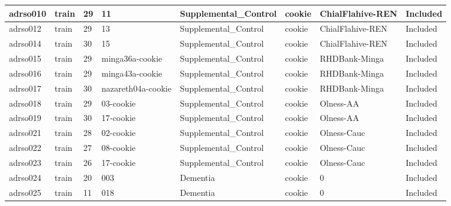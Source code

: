 \begin{center}
\begin{longtable}{|l|l|l|l|l|l|l|l|}
adrso010       & train                 & 29              & 11                 & Supplemental\_Control & cookie          & ChialFlahive-REN & Included      \\ \hline
adrso012       & train                 & 29              & 13                 & Supplemental\_Control & cookie          & ChialFlahive-REN & Included      \\ \hline
adrso014       & train                 & 30              & 15                 & Supplemental\_Control & cookie          & ChialFlahive-REN & Included      \\ \hline
adrso015       & train                 & 29              & minga36a-cookie    & Supplemental\_Control & cookie          & RHDBank-Minga    & Included      \\ \hline
adrso016       & train                 & 29              & minga43a-cookie    & Supplemental\_Control & cookie          & RHDBank-Minga    & Included      \\ \hline
adrso017       & train                 & 30              & nazareth04a-cookie & Supplemental\_Control & cookie          & RHDBank-Minga    & Included      \\ \hline
adrso018       & train                 & 29              & 03-cookie          & Supplemental\_Control & cookie          & Olness-AA        & Included      \\ \hline
adrso019       & train                 & 30              & 17-cookie          & Supplemental\_Control & cookie          & Olness-AA        & Included      \\ \hline
adrso021       & train                 & 28              & 02-cookie          & Supplemental\_Control & cookie          & Olness-Cauc      & Included      \\ \hline
adrso022       & train                 & 27              & 08-cookie          & Supplemental\_Control & cookie          & Olness-Cauc      & Included      \\ \hline
adrso023       & train                 & 26              & 17-cookie          & Supplemental\_Control & cookie          & Olness-Cauc      & Included      \\ \hline
adrso024       & train                 & 20              & 003                & Dementia             & cookie          & 0                & Included      \\ \hline
adrso025       & train                 & 11              & 018                & Dementia             & cookie          & 0                & Included      \\ \hline

\end{longtable}
\end{center}

